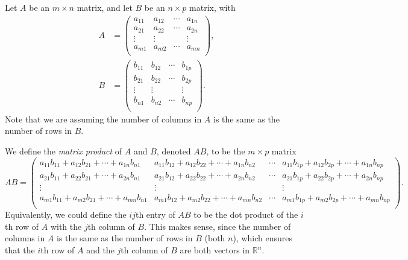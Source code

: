 \documentclass{ximera}
\begin{document}
\begin{definition}
Let $A$ be an $m\times n$ matrix, and let $B$ be an $n\times p$ matrix, with  
\begin{align*}
A &= \left(\begin{array}{cccc}
a_{11}& a_{12} & \cdots & a_{1n}\\
a_{21}& a_{22} & \cdots & a_{2n}\\
\vdots & \vdots & & \vdots\\
a_{m1}& a_{m2} & \cdots & a_{mn}\\
\end{array}\right), \\
B &= \left(\begin{array}{cccc}
b_{11}& b_{12} & \cdots & b_{1p}\\
b_{21}& b_{22} & \cdots & b_{2p}\\
\vdots & \vdots & & \vdots\\
b_{n1}& b_{n2} & \cdots & b_{np}\\
\end{array}\right).
\end{align*}
Note that we are assuming the number of columns in $A$ is the same as the number of rows in $B$.

We define the \emph{matrix product} of $A$ and $B$, denoted $AB$, to be the $m\times p$ matrix
\[
AB = \left(\begin{array}{cccc}
a_{11}b_{11} + a_{12}b_{21}+\cdots + a_{1n}b_{n1}& a_{11}b_{12} + a_{12}b_{22}+\cdots + a_{1n}b_{n2} & \cdots & a_{11}b_{1p} + a_{12}b_{2p}+\cdots + a_{1n}b_{np}\\
a_{21}b_{11} + a_{22}b_{21}+\cdots + a_{2n}b_{n1}& a_{21}b_{12} + a_{22}b_{22}+\cdots + a_{2n}b_{n2} & \cdots & a_{21}b_{1p} + a_{22}b_{2p}+\cdots + a_{2n}b_{np}\\
\vdots & \vdots & & \vdots\\
a_{m1}b_{11} + a_{m2}b_{21}+\cdots + a_{mn}b_{n1}& a_{m1}b_{12} + a_{m2}b_{22}+\cdots + a_{mn}b_{n2} & \cdots & a_{m1}b_{1p} + a_{m2}b_{2p}+\cdots + a_{mn}b_{np}\\
\end{array}\right).
\] 
Equivalently, we could define the $ij$th entry of $AB$ to be the dot product of the $i$th row of $A$ with the $j$th column of $B$. This makes sense, since the number of columns in $A$ is the same as the number of rows in $B$ (both $n$), which ensures that the $i$th row of $A$ and the $j$th column of $B$ are both vectors in $\mathbb{R}^n$.
\end{definition}
\end{document}
